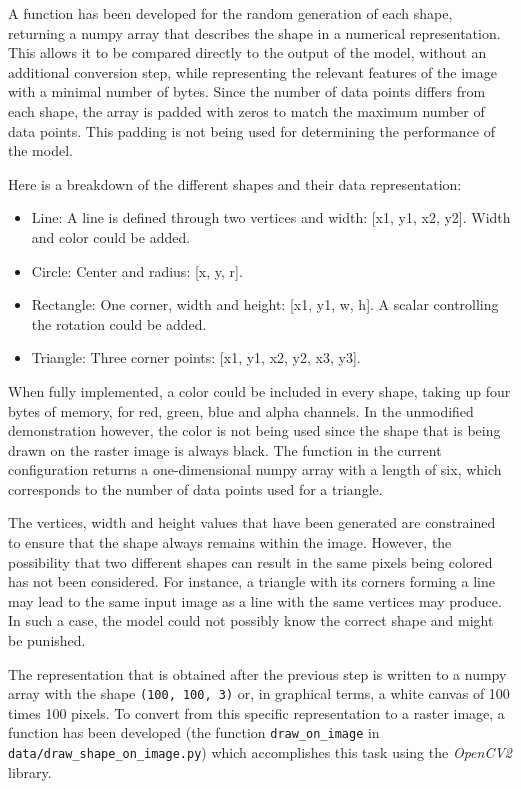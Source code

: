 \documentclass[12pt, a4paper, titlepage]{report}
\begin{document}
A function has been developed for the random generation of each shape, returning a numpy array that describes the shape in a numerical representation. This allows it to be compared directly to the output of the model, without an additional conversion step, while representing the relevant features of the image with a minimal number of bytes. Since the number of data points differs from each shape, the array is padded with zeros to match the maximum number of data points. This padding is not being used for determining the performance of the model.

\vspace{0.2cm}
Here is a breakdown of the different shapes and their data representation:

\begin{itemize}
   \item Line: A line is defined through two vertices and width: [x1, y1, x2, y2]. Width and color could be added.
   \item Circle: Center and radius: [x, y, r].
   \item Rectangle: One corner, width and height: [x1, y1, w, h]. A scalar controlling the rotation could be added.
   \item Triangle: Three corner points: [x1, y1, x2, y2, x3, y3].
\end{itemize}

When fully implemented, a color could be included in every shape, taking up four bytes of memory, for red, green, blue and alpha channels. In the unmodified demonstration however, the color is not being used since the shape that is being drawn on the raster image is always black.
The function in the current configuration returns a one-dimensional numpy array with a length of six, which corresponds to the number of data points used for a triangle.


The vertices, width and height values that have been generated are constrained to ensure that the shape always remains within the image. However, the possibility that two different shapes can result in the same pixels being colored has not been considered. For instance, a triangle with its corners forming a line may lead to the same input image as a line with the same vertices may produce. In such a case, the model could not possibly know the correct shape and might be punished.

The representation that is obtained after the previous step is written to a numpy array with the shape \lstinline{(100, 100, 3)} or, in graphical terms, a white canvas of 100 times 100 pixels. To convert from this specific representation to a raster image, a function has been developed (the function \lstinline{draw_on_image} in \lstinline{data/draw_shape_on_image.py}) which accomplishes this task using the \emph{OpenCV2} library.
\end{document}
